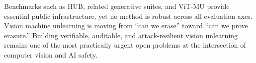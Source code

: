 \documentclass[10pt,twocolumn,letterpaper]{article}
\begin{document}
Benchmarks such as HUB, related generative suites, and ViT-MU provide essential public infrastructure, yet no method is robust across all evaluation axes. Vision machine unlearning is moving from ``can we erase'' toward ``can we prove erasure.'' Building verifiable, auditable, and attack-resilient vision unlearning remains one of the most practically urgent open problems at the intersection of computer vision and AI safety.

{\small


}
\end{document}

